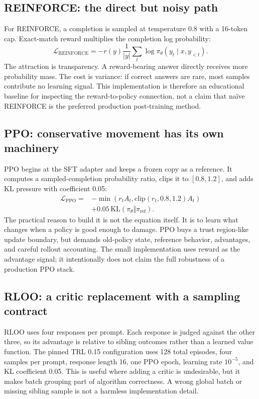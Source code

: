 \documentclass[10pt]{article}
\begin{document}
\subsection{REINFORCE: the direct but noisy path}
For REINFORCE, a completion is sampled at temperature 0.8 with a 16-token cap. Exact-match reward multiplies the completion log probability:
\[
\mathcal{L}_{\mathrm{REINFORCE}}=-r(y)\frac{1}{|y|}\sum_t\log\pi_\theta(y_t\mid x,y_{<t}).
\]
The attraction is transparency. A reward-bearing answer directly receives more probability mass. The cost is variance: if correct answers are rare, most samples contribute no learning signal. This implementation is therefore an educational baseline for inspecting the reward-to-policy connection, not a claim that naïve REINFORCE is the preferred production post-training method.

\subsection{PPO: conservative movement has its own machinery}
PPO begins at the SFT adapter and keeps a frozen copy as a reference. It computes a sampled-completion probability ratio, clips it to $[0.8,1.2]$, and adds KL pressure with coefficient 0.05:
\[
\begin{aligned}
\mathcal{L}_{\mathrm{PPO}}={}&-\min\left(r_t A_t,\mathrm{clip}(r_t,0.8,1.2)A_t\right)\\
&+0.05\,\mathrm{KL}(\pi_\theta\Vert\pi_{\mathrm{ref}}).
\end{aligned}
\]
The practical reason to build it is not the equation itself. It is to learn what changes when a policy is good enough to damage. PPO buys a trust region-like update boundary, but demands old-policy state, reference behavior, advantages, and careful rollout accounting. The small implementation uses reward as the advantage signal; it intentionally does not claim the full robustness of a production PPO stack.

\subsection{RLOO: a critic replacement with a sampling contract}
RLOO uses four responses per prompt. Each response is judged against the other three, so its advantage is relative to sibling outcomes rather than a learned value function. The pinned TRL 0.15 configuration uses 128 total episodes, four samples per prompt, response length 16, one PPO epoch, learning rate $10^{-5}$, and KL coefficient 0.05. This is useful where adding a critic is undesirable, but it makes batch grouping part of algorithm correctness. A wrong global batch or missing sibling sample is not a harmless implementation detail.
\end{document}
